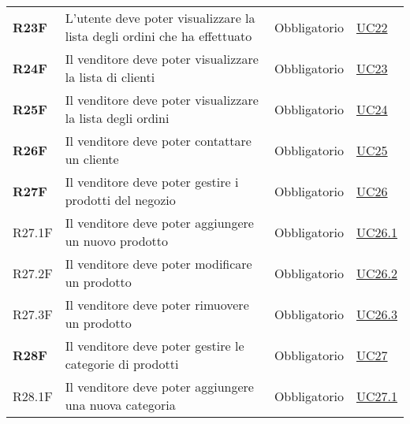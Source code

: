 \begin{center}
\begin{longtable}[!h]{p{50px} p{245px} p{75px} p{50px}}
        \textbf{R23F}                         & L'utente deve poter visualizzare la lista degli ordini che ha effettuato                            & Obbligatorio             & \hyperref[sec:UC22]{UC22}                    \\
        \textbf{R24F}                         & Il venditore deve poter visualizzare la lista di clienti                                            & Obbligatorio             & \hyperref[sec:UC23]{UC23}                    \\
        \textbf{R25F}                         & Il venditore deve poter visualizzare la lista degli ordini                                          & Obbligatorio             & \hyperref[sec:UC24]{UC24}                    \\
        \textbf{R26F}                         & Il venditore deve poter contattare un cliente                                                       & Obbligatorio             & \hyperref[sec:UC25]{UC25}                    \\
        \textbf{R27F}                         & Il venditore deve poter gestire i prodotti del negozio                                              & Obbligatorio             & \hyperref[sec:UC26]{UC26}                    \\
        R27.1F                                & Il venditore deve poter aggiungere un nuovo prodotto                                                & Obbligatorio             & \hyperref[sec:UC26.1]{UC26.1}                \\
        R27.2F                                & Il venditore deve poter modificare un prodotto                                                      & Obbligatorio             & \hyperref[sec:UC26.2]{UC26.2}                \\
        R27.3F                                & Il venditore deve poter rimuovere un prodotto                                                       & Obbligatorio             & \hyperref[sec:UC26.3]{UC26.3}                \\
        \textbf{R28F}                         & Il venditore deve poter gestire le categorie di prodotti                                            & Obbligatorio             & \hyperref[sec:UC27]{UC27}                    \\
        R28.1F                                & Il venditore deve poter aggiungere una nuova categoria                                              & Obbligatorio             & \hyperref[sec:UC27.1]{UC27.1}                \\

\end{longtable}
\end{center}
